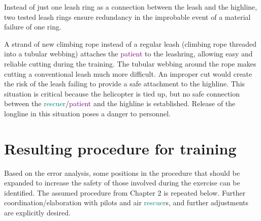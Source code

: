 \documentclass[a4paper,10pt]{scrartcl}
\begin{document}
Instead of just one leash ring as a connection between the leash and the highline, two tested leash rings ensure redundancy in the improbable event of a material failure of one ring.

A strand of new climbing rope instead of a regular leash (climbing rope
threaded into a tubular webbing) attaches the \textcolor{purple}{patient} to the leashring, allowing easy and reliable cutting during the training. The tubular webbing around the rope makes cutting a conventional leash much more difficult. An improper cut would create the risk of the leash failing to provide a safe attachment to the highline. This situation is critical because the helicopter is tied up, but no safe connection between the \textcolor{teal}{rescuer}/\textcolor{purple}{patient} and the highline is established. Release of the longline in this situation poses a danger to personnel.

\section{Resulting procedure for training}
\label{sec:result}

Based on the error analysis, some positions in the procedure that should be expanded to increase
the safety of those involved during the exercise can be identified. The assumed procedure from Chapter 2 is repeated below.
Further coordination/elaboration with pilots and air \textcolor{teal}{rescuer}s, and further adjustments are explicitly
desired.
\end{document}
